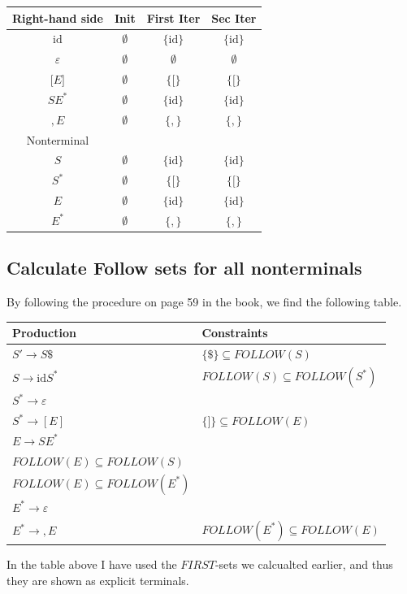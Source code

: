\documentclass[11pt,a4paper]{article}
\begin{document}
\begin{center}
\begin{tabular}{c||c|c|c}
Right-hand side & Init & First Iter & Sec Iter\tabularnewline
\hline 
\hline 
$\mathrm{id}$ & \emph{$\emptyset$} & $\{\mathrm{id}\}$ & $\{\mathrm{id}\}$\tabularnewline
\hline 
$\varepsilon$ & \emph{$\emptyset$} & \emph{$\emptyset$} & \emph{$\emptyset$}\tabularnewline
\hline 
$[E\mathrm{\mathrm{]}}$ & \emph{$\emptyset$} & $\{[\}$ & $\{[\}$\tabularnewline
\hline 
$SE^{*}$ & \emph{$\emptyset$} & $\{\mathrm{id}\}$ & $\{\mathrm{id}\}$\tabularnewline
\hline 
$\mathrm{,}E$ & \emph{$\emptyset$} & $\{,\}$ & $\{,\}$\tabularnewline
\hline 
Nonterminal & \multicolumn{1}{c}{} & \multicolumn{1}{c}{} & \tabularnewline
\hline 
$S$ & \emph{$\emptyset$} & $\{\mathrm{id}\}$ & $\{\mathrm{id}\}$\tabularnewline
\hline 
$S^{*}$ & \emph{$\emptyset$} & $\{[\}$ & $\{[\}$\tabularnewline
\hline 
$E$ & \emph{$\emptyset$} & $\{\mathrm{id}\}$ & $\{\mathrm{id}\}$\tabularnewline
\hline 
$E^{*}$ & \emph{$\emptyset$} & $\{,\}$ & $\{,\}$\tabularnewline
\end{tabular}
\end{center}

\subsection{Calculate Follow sets for all nonterminals}
By following the procedure on page 59 in the book, we find the following table.
\begin{center}
\begin{tabular}{ll}
\hline 
Production & Constraints\tabularnewline
\hline 
$S'\rightarrow S\$$ & $\{\$\}\subseteq FOLLOW(S)$\tabularnewline
$S\rightarrow\mathrm{id}S^{*}$ & $FOLLOW(S)\subseteq FOLLOW(S^{*})$\tabularnewline
$S^{*}\rightarrow\varepsilon$ & \tabularnewline
$S^{*}\rightarrow[E]$ & $\{\mathrm{]}\}\subseteq FOLLOW(E)$\tabularnewline
$E\rightarrow SE^{*}$ & %
\begin{minipage}[t]{0.5\columnwidth}%
$\{\mathrm{,}\}\subseteq FOLLOW(S)$ \\
$FOLLOW(E)\subseteq FOLLOW(S)$ \\
$FOLLOW(E)\subseteq FOLLOW(E^{*})$%
\end{minipage}\tabularnewline
$E^{*}\rightarrow\varepsilon$ & \tabularnewline
$E^{*}\rightarrow\mathrm{,}E$ & $FOLLOW(E^{*})\subseteq FOLLOW(E)$\tabularnewline
\hline
\end{tabular}
\end{center}
In the table above I have used the $FIRST$-sets we calcualted earlier, and thus they are shown as explicit terminals.
\end{document}
